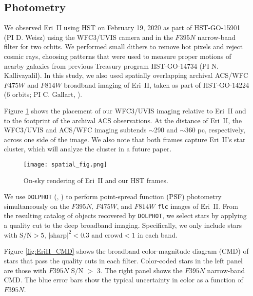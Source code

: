 \documentclass[twocolumn]{aastex63}
\begin{document}
\subsection{Photometry}

\par We observed Eri~II using HST on February 19, 2020 as part of HST-GO-15901 (PI D. Weisz) using the WFC3/UVIS camera and in the $F395N$ narrow-band filter for two orbits. We performed small dithers to remove hot pixels and reject cosmic rays, choosing patterns that were used to measure proper motions of nearby galaxies from previous Treasury program HST-GO-14734 (PI N. Kallivayalil). In this study, we also used spatially overlapping archival ACS/WFC $F475W$ and $F814W$ broadband imaging of Eri~II, taken as part of HST-GO-14224 (6 orbits; PI C. Gallart, \citealt{gallart2021eriii}).

\par Figure \ref{fig:spatial} shows the placement of our WFC3/UVIS imaging relative to Eri~II and to the footprint of the archival ACS observations. At the distance of Eri~II, the WFC3/UVIS and ACS/WFC imaging subtends $\sim$290 and $\sim$360 pc, respectively, across one side of the image. We also note that both frames capture Eri~II's star cluster, which will analyze the cluster in a future paper. 

\begin{figure}
    \centering
    \texttt{[image: spatial\_fig.png]}
    \caption{On-sky rendering of Eri~II and our HST frames. }
    \label{fig:spatial}
\end{figure}


\par We use \texttt{DOLPHOT} (\citealt{dolphot2016}, \citealt{hstphot2000}) to perform point-spread function (PSF) photometry simultaneously on the $F395N$, $F475W$, and $F814W$ \texttt{flc} images of Eri~II. From the resulting catalog of objects recovered by \texttt{DOLPHOT}, we select stars by applying a quality cut to the deep broadband imaging. Specifically, we only include stars with $\mbox{S/N} > 5$, $|\mbox{sharp}|^2 < 0.3$ and $\mbox{crowd} < 1$ in each band. 

\par Figure \ref{fig:EriII_CMD} shows the broadband color-magnitude diagram (CMD) of stars that pass the quality cuts in each filter. Color-coded stars in the left panel are those with $F395N$ S/N $>$ 3. The right panel shows the $F395N$ narrow-band CMD. The blue error bars show the typical uncertainty in color as a function of $F395N$. 
\end{document}
